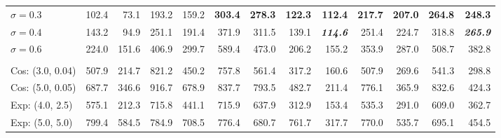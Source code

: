 \begin{table}[htbp]
\begin{tabular}{lrrrrrrrrrrrr}
\quad $\sigma=0.3$ & 102.4 & 73.1 & 193.2 & 159.2 & \textbf{303.4} & \textbf{278.3} & \textbf{122.3} & \textbf{112.4} & \textbf{217.7} & \textbf{207.0} & \textbf{264.8} & \textbf{248.3} \\
\quad $\sigma=0.4$ & 143.2 & 94.9 & 251.1 & 191.4 & 371.9 & 311.5 & 139.1 & \textbf{\textit{114.6}} & 251.4 & 224.7 & 318.8 & \textbf{\textit{265.9}} \\
\quad $\sigma=0.6$ & 224.0 & 151.6 & 406.9 & 299.7 & 589.4 & 473.0 & 206.2 & 155.2 & 353.9 & 287.0 & 508.7 & 382.8 \\
\rowcolor{gray!20} \multicolumn{13}{l}{\textit{Noise-to-Data Diffusion ($\approx$ DDPM, SMLD \cite{song2020score})}} \\
\quad Cos: (3.0, 0.04) & 507.9 & 214.7 & 821.2 & 450.2 & 757.8 & 561.4 & 317.2 & 160.6 & 507.9 & 269.6 & 541.3 & 298.8 \\
\quad Cos: (5.0, 0.05) & 687.7 & 346.6 & 916.7 & 678.9 & 837.7 & 793.5 & 482.7 & 211.4 & 776.1 & 365.9 & 832.6 & 424.3 \\
\quad Exp: (4.0, 2.5) & 575.1 & 212.3 & 715.8 & 441.1 & 715.9 & 637.9 & 312.9 & 153.4 & 535.3 & 291.0 & 609.0 & 362.7 \\
\quad Exp: (5.0, 5.0) & 799.4 & 584.5 & 784.9 & 708.5 & 776.4 & 680.7 & 761.7 & 317.7 & 770.0 & 535.7 & 695.1 & 454.5 \\
\bottomrule
\end{tabular}
\end{table}
